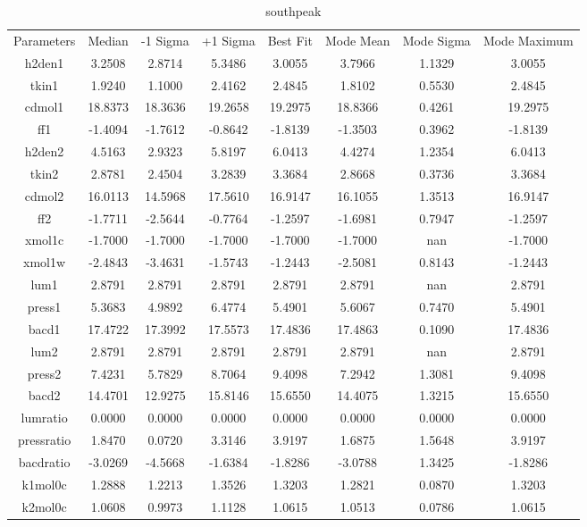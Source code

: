 \begin{table}
\caption{southpeak}
\begin{tabular}{cccccccc}
Parameters & Median & -1 Sigma & +1 Sigma & Best Fit & Mode Mean & Mode Sigma & Mode Maximum \\
h2den1 & 3.2508 & 2.8714 & 5.3486 & 3.0055 & 3.7966 & 1.1329 & 3.0055 \\
tkin1 & 1.9240 & 1.1000 & 2.4162 & 2.4845 & 1.8102 & 0.5530 & 2.4845 \\
cdmol1 & 18.8373 & 18.3636 & 19.2658 & 19.2975 & 18.8366 & 0.4261 & 19.2975 \\
ff1 & -1.4094 & -1.7612 & -0.8642 & -1.8139 & -1.3503 & 0.3962 & -1.8139 \\
h2den2 & 4.5163 & 2.9323 & 5.8197 & 6.0413 & 4.4274 & 1.2354 & 6.0413 \\
tkin2 & 2.8781 & 2.4504 & 3.2839 & 3.3684 & 2.8668 & 0.3736 & 3.3684 \\
cdmol2 & 16.0113 & 14.5968 & 17.5610 & 16.9147 & 16.1055 & 1.3513 & 16.9147 \\
ff2 & -1.7711 & -2.5644 & -0.7764 & -1.2597 & -1.6981 & 0.7947 & -1.2597 \\
xmol1c & -1.7000 & -1.7000 & -1.7000 & -1.7000 & -1.7000 & nan & -1.7000 \\
xmol1w & -2.4843 & -3.4631 & -1.5743 & -1.2443 & -2.5081 & 0.8143 & -1.2443 \\
lum1 & 2.8791 & 2.8791 & 2.8791 & 2.8791 & 2.8791 & nan & 2.8791 \\
press1 & 5.3683 & 4.9892 & 6.4774 & 5.4901 & 5.6067 & 0.7470 & 5.4901 \\
bacd1 & 17.4722 & 17.3992 & 17.5573 & 17.4836 & 17.4863 & 0.1090 & 17.4836 \\
lum2 & 2.8791 & 2.8791 & 2.8791 & 2.8791 & 2.8791 & nan & 2.8791 \\
press2 & 7.4231 & 5.7829 & 8.7064 & 9.4098 & 7.2942 & 1.3081 & 9.4098 \\
bacd2 & 14.4701 & 12.9275 & 15.8146 & 15.6550 & 14.4075 & 1.3215 & 15.6550 \\
lumratio & 0.0000 & 0.0000 & 0.0000 & 0.0000 & 0.0000 & 0.0000 & 0.0000 \\
pressratio & 1.8470 & 0.0720 & 3.3146 & 3.9197 & 1.6875 & 1.5648 & 3.9197 \\
bacdratio & -3.0269 & -4.5668 & -1.6384 & -1.8286 & -3.0788 & 1.3425 & -1.8286 \\
k1mol0c & 1.2888 & 1.2213 & 1.3526 & 1.3203 & 1.2821 & 0.0870 & 1.3203 \\
k2mol0c & 1.0608 & 0.9973 & 1.1128 & 1.0615 & 1.0513 & 0.0786 & 1.0615 \\

\end{tabular}
\end{table}
